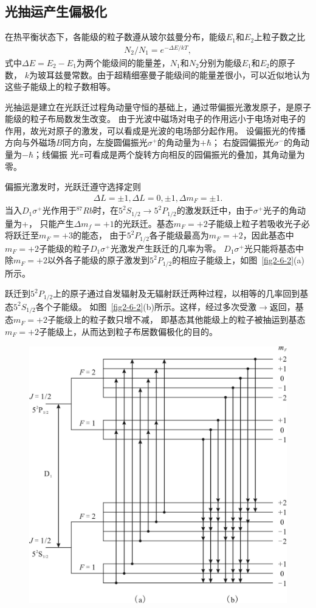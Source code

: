 \documentclass[11pt,a4paper]{article}
\begin{document}
\begin{spacing}{1.3}
\begin{CJK*}{UTF8}{gbsn}
\subsection{光抽运产生偏极化}
在热平衡状态下，各能级的粒子数遵从玻尔兹曼分布，能级$E_1$和$E_2$上粒子数之比
\begin{eqnarray} \label{2-6-6}
N_2/N_1=e^{-\Delta E/kT},
\end{eqnarray}
式中$\Delta E=E_2-E_1$为两个能级间的能量差，$N_1$和$N_2$分别为能级$E_1$和$E_2$的原子数，
$k$为玻耳兹曼常数。由于超精细塞曼子能级间的能量差很小，可以近似地认为这些子能级上的粒子数相等。\par
光抽运是建立在光跃迁过程角动量守恒的基础上，通过带偏振光激发原子，是原子能级的粒子布局数发生改变。
由于光波中磁场对电子的作用远小于电场对电子的作用，故光对原子的激发，可以看成是光波的电场部分起作用。
设偏振光的传播方向与外磁场$B$同方向，左旋圆偏振光$\sigma^+$的角动量为$+\hbar$；
右旋园偏振光$\sigma^-$的角动量为$-\hbar$；线偏振 光$\pi$可看成是两个旋转方向相反的园偏振光的叠加，其角动量为零。
\par 
偏振光激发时，光跃迁遵守选择定则
\begin{eqnarray} \label{2-6-7}
\Delta L=\pm 1,\Delta L=0,\pm1,\Delta m_F=\pm1.
\end{eqnarray}
当入$D_1\sigma^+$光作用于$^{87}Rb$时，在$5^2S_{1/2} \to 5^2P_{1/2}$的激发跃迁中，由于$\sigma^+$光子的角动量为+，
只能产生$\Delta m_f=+1$的光跃迁。基态$m_F=+2$子能级上粒子若吸收光子必将跃迁至$m_F=+3$的能态，
由于$5^2P_{1/2}$各子能级最高为$m_F=+2$，因此基态中$m_F=+2$子能级的粒子$D_1\sigma^+$光激发产生跃迁的几率为零。
$D_1\sigma^+$光只能将基态中除$m_F = +2$以外各子能级的原子激发到$5^2P_{1/2}$的相应子能级上，如图~\ref{fig2-6-2}(a)所示。\par
跃迁到$5^2P_{1/2}$上的原子通过自发辐射及无辐射跃迁两种过程，以相等的几率回到基态$5^2S_{1/2}$各个子能级。
如图~\ref{fig2-6-2}(b)所示。这样，经过多次受激$\to$返回，基态$m_F=+2$子能级上的粒子数只增不减，
即基态其他能级上的粒子被抽运到基态$m_F=+2$子能级上，从而达到粒子布居数偏极化的目的。
 \begin{figure}[!h]
\centering
\includegraphics[width=.6\textwidth]{fig2-6-2}

\end{figure}
\end{CJK*}
\end{spacing}
\end{document}
